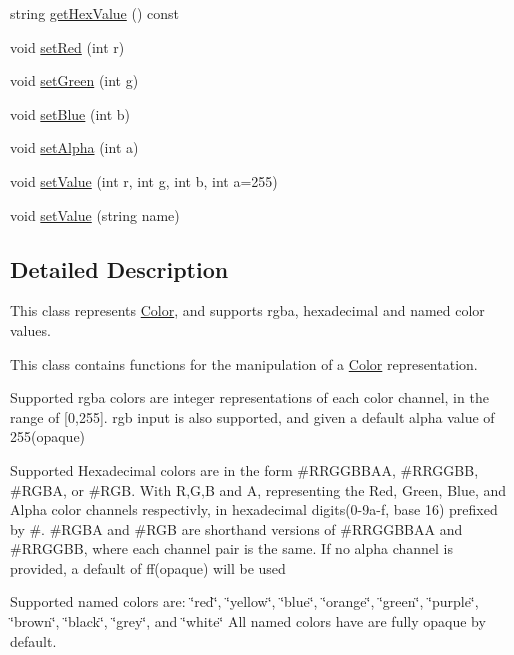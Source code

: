 \begin{DoxyCompactItemize}
\item 
string \hyperlink{classbridges_1_1_color_abdf44b8eb8c79452e38b93c02fb0aa99}{get\+Hex\+Value} () const 
\item 
void \hyperlink{classbridges_1_1_color_a6d7521acce040aca88645f6ad1bf5f44}{set\+Red} (int r)
\item 
void \hyperlink{classbridges_1_1_color_a7689ebb07ae20ad846827e4f42546ba8}{set\+Green} (int g)
\item 
void \hyperlink{classbridges_1_1_color_a3b0e703dd68d7e695664264908e0f709}{set\+Blue} (int b)
\item 
void \hyperlink{classbridges_1_1_color_ab139e842be237a8963d46c6a3edb488d}{set\+Alpha} (int a)
\item 
void \hyperlink{classbridges_1_1_color_a3d6c66d33bd8a702a4436925c9cbd1fd}{set\+Value} (int r, int g, int b, int a=255)
\item 
void \hyperlink{classbridges_1_1_color_aa6e1db9aa47275ef829ac0fa96d72190}{set\+Value} (string name)
\end{DoxyCompactItemize}


\subsection{Detailed Description}
This class represents \hyperlink{classbridges_1_1_color}{Color}, and supports rgba, hexadecimal and named color values. 

This class contains functions for the manipulation of a \hyperlink{classbridges_1_1_color}{Color} representation.

Supported rgba colors are integer representations of each color channel, in the range of \mbox{[}0,255\mbox{]}. rgb input is also supported, and given a default alpha value of 255(opaque)

Supported Hexadecimal colors are in the form \#\+R\+R\+G\+G\+B\+B\+A\+A, \#\+R\+R\+G\+G\+B\+B, \#\+R\+G\+B\+A, or \#\+R\+G\+B. With R,G,B and A, representing the Red, Green, Blue, and Alpha color channels respectivly, in hexadecimal digits(0-\/9a-\/f, base 16) prefixed by \textquotesingle{}\#\textquotesingle{}. \#\+R\+G\+B\+A and \#\+R\+G\+B are shorthand versions of \#\+R\+R\+G\+G\+B\+B\+A\+A and \#\+R\+R\+G\+G\+B\+B, where each channel pair is the same. If no alpha channel is provided, a default of \textquotesingle{}ff\textquotesingle{}(opaque) will be used

Supported named colors are\+: \char`\"{}red\char`\"{}, \char`\"{}yellow\char`\"{}, \char`\"{}blue\char`\"{}, \char`\"{}orange\char`\"{}, \char`\"{}green\char`\"{}, \char`\"{}purple\char`\"{}, \char`\"{}brown\char`\"{}, \char`\"{}black\char`\"{}, \char`\"{}grey\char`\"{}, and \char`\"{}white\char`\"{} All named colors have are fully opaque by default.

